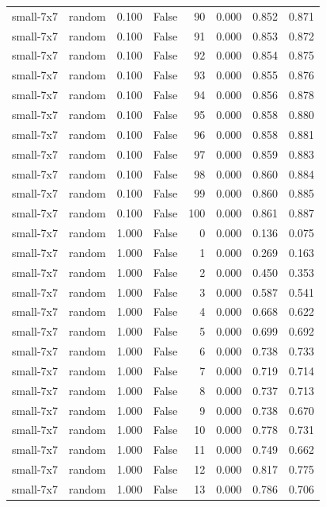 \begin{tabular}{llrrrrrr}
small-7x7 & random & 0.100 & False & 90 & 0.000 & 0.852 & 0.871 \\
small-7x7 & random & 0.100 & False & 91 & 0.000 & 0.853 & 0.872 \\
small-7x7 & random & 0.100 & False & 92 & 0.000 & 0.854 & 0.875 \\
small-7x7 & random & 0.100 & False & 93 & 0.000 & 0.855 & 0.876 \\
small-7x7 & random & 0.100 & False & 94 & 0.000 & 0.856 & 0.878 \\
small-7x7 & random & 0.100 & False & 95 & 0.000 & 0.858 & 0.880 \\
small-7x7 & random & 0.100 & False & 96 & 0.000 & 0.858 & 0.881 \\
small-7x7 & random & 0.100 & False & 97 & 0.000 & 0.859 & 0.883 \\
small-7x7 & random & 0.100 & False & 98 & 0.000 & 0.860 & 0.884 \\
small-7x7 & random & 0.100 & False & 99 & 0.000 & 0.860 & 0.885 \\
small-7x7 & random & 0.100 & False & 100 & 0.000 & 0.861 & 0.887 \\
small-7x7 & random & 1.000 & False & 0 & 0.000 & 0.136 & 0.075 \\
small-7x7 & random & 1.000 & False & 1 & 0.000 & 0.269 & 0.163 \\
small-7x7 & random & 1.000 & False & 2 & 0.000 & 0.450 & 0.353 \\
small-7x7 & random & 1.000 & False & 3 & 0.000 & 0.587 & 0.541 \\
small-7x7 & random & 1.000 & False & 4 & 0.000 & 0.668 & 0.622 \\
small-7x7 & random & 1.000 & False & 5 & 0.000 & 0.699 & 0.692 \\
small-7x7 & random & 1.000 & False & 6 & 0.000 & 0.738 & 0.733 \\
small-7x7 & random & 1.000 & False & 7 & 0.000 & 0.719 & 0.714 \\
small-7x7 & random & 1.000 & False & 8 & 0.000 & 0.737 & 0.713 \\
small-7x7 & random & 1.000 & False & 9 & 0.000 & 0.738 & 0.670 \\
small-7x7 & random & 1.000 & False & 10 & 0.000 & 0.778 & 0.731 \\
small-7x7 & random & 1.000 & False & 11 & 0.000 & 0.749 & 0.662 \\
small-7x7 & random & 1.000 & False & 12 & 0.000 & 0.817 & 0.775 \\
small-7x7 & random & 1.000 & False & 13 & 0.000 & 0.786 & 0.706 \\

\end{tabular}
